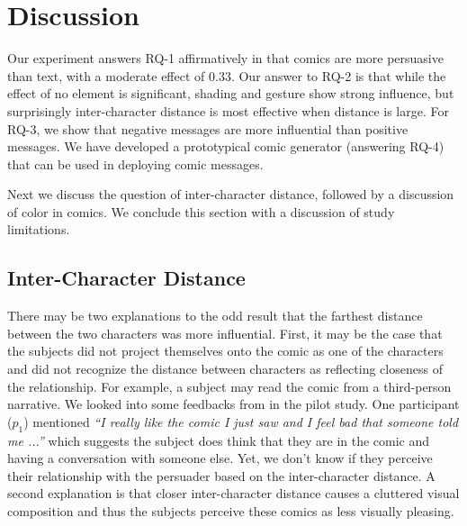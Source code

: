 \section{Discussion}
\label{sec:Discussion}
Our experiment answers RQ-1 affirmatively in that comics are more persuasive than text, with a moderate effect of 0.33. Our answer to RQ-2 is that while the effect of no element is significant, shading and gesture show strong influence, but surprisingly inter-character distance is most effective when distance is large. For RQ-3, we show that negative messages are more influential than positive messages. We have developed a prototypical comic generator (answering RQ-4) that can be used in deploying comic messages.

Next we discuss the question of inter-character distance, followed by a discussion of color in comics. We conclude this section with a discussion of study limitations.

%

%
\subsection{Inter-Character Distance}
\label{sub:Inter-Character Distance}
There may be two explanations to the odd result that the farthest distance between the two characters was more influential.
First, it may be the case that the subjects did not project themselves onto the comic as one of the characters and did not recognize the distance between characters as reflecting closeness of the relationship. For example, a subject may read the comic from a third-person narrative. We looked into some feedbacks from in the pilot study. One participant ($p_1$) mentioned \textit{``I really like the comic I just saw and I feel bad that someone told me ...''} which suggests the subject does think that they are in the comic and having a conversation with someone else. Yet, we don't know if they perceive their relationship with the persuader based on the inter-character distance. A second explanation is that closer inter-character distance causes a cluttered visual composition and thus the subjects perceive these comics as less visually pleasing.

